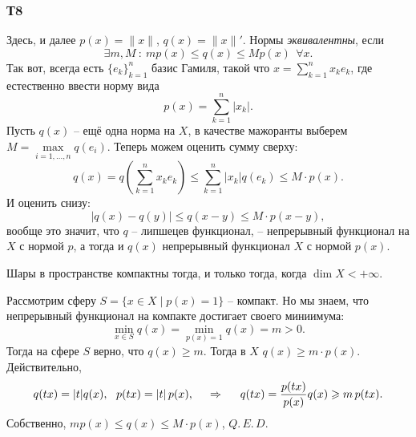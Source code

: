 

\subsubsection*{Т8}

Здесь, и далее $p(x) = \|x\|$, $q(x) = \|x\|'$. Нормы \textit{эквивалентны}, если
\begin{equation*}
    \exists m, M \ \colon  \ m p(x) \leq q(x) \leq M p(x) \  \ \forall x.
\end{equation*}
Так вот, всегда есть $\{e_k\}_{k=1}^n$ базис Гамиля, такой что $x = \sum_{k=1}^n x_k e_k$, где естественно ввести норму вида
\begin{equation*}
    p(x) = \sum_{k=1}^n |x_k|.
\end{equation*}
Пусть $q(x)$ -- ещё одна норма на $X$, в качестве мажоранты выберем $M = \max\limits_{i=1, \ldots, n}  q(e_i)$.
Теперь можем оценить сумму сверху:
\begin{equation*}
    q(x) = q\left(
        \sum_{k=1}^n x_k e_k
    \right) \leq \sum_{k=1}^{n} |x_k| q(e_k) \leq M \cdot p(x).
\end{equation*}
И оценить снизу:
\begin{equation*}
    |q(x) - q(y)| \leq q(x-y) \leq M \cdot p (x-y),
\end{equation*}
вообще это значит, что $q$ -- липшецев функционал, -- непрерывный функционал на $X$ с нормой $p$, а тогда и $q(x)$ непрерывный функционал $X$ с нормой $p(x)$. 


\begin{to_lem}
    Шары в пространстве компактны тогда, и только тогда, когда $\dim X < + \infty$.
\end{to_lem}

Рассмотрим сферу $S = \{x \in X \mid p(x) = 1\}$ -- компакт. Но мы знаем, что непрерывный функционал на компакте достигает своего миниимума:
\begin{equation*}
    \min_{x \in S} q(x) = \min_{p(x)=1} q(x) = m > 0.
\end{equation*}
Тогда на сфере $S$ верно, что $q(x) \geq m$. Тогда в $X$ $q(x) \geq m \cdot p(x)$. Действительно,
\begin{equation*}
    q(tx) = |t|q(x), \ \  p(tx) = |t| \, p(x), \hspace{0.5cm} \Rightarrow \hspace{0.5cm}
    q(tx) = \frac{p(tx)}{p(x)} q(x) \geq m\, p(tx).
\end{equation*}
Собственно, $m p(x) \leq q(x) \leq M \cdot p(x)$,  $Q.\, E.\, D.$


